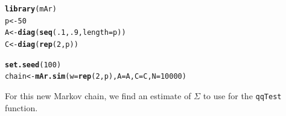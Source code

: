 \documentclass[11pt]{article}\usepackage[]{graphicx}\usepackage[]{color}
\makeatletter
\newcommand{\hlnum}[1]{\textcolor[rgb]{0.686,0.059,0.569}{#1}}%
\newcommand{\hlstd}[1]{\textcolor[rgb]{0.345,0.345,0.345}{#1}}%
\newcommand{\hlkwb}[1]{\textcolor[rgb]{0.69,0.353,0.396}{#1}}%
\newcommand{\hlkwc}[1]{\textcolor[rgb]{0.333,0.667,0.333}{#1}}%
\newcommand{\hlkwd}[1]{\textcolor[rgb]{0.737,0.353,0.396}{\textbf{#1}}}%
\newenvironment{kframe}{%
 \def\at@end@of@kframe{}%
 \ifinner\ifhmode%
  \def\at@end@of@kframe{\end{minipage}}%
  \begin{minipage}{\columnwidth}%
 \fi\fi%
 \def\FrameCommand##1{\hskip\@totalleftmargin \hskip-\fboxsep
 \colorbox{shadecolor}{##1}\hskip-\fboxsep
     \hskip-\linewidth \hskip-\@totalleftmargin \hskip\columnwidth}%
 \MakeFramed {\advance\hsize-\width
   \@totalleftmargin\z@ \linewidth\hsize
   \@setminipage}}%
 {\par\unskip\endMakeFramed%
 \at@end@of@kframe}
\newenvironment{knitrout}{}{} %
\makeatother
\begin{document}
\begin{knitrout}
\color{fgcolor}\begin{kframe}
\begin{alltt}
\hlkwd{library}\hlstd{(mAr)}
\hlstd{p} \hlkwb{<-} \hlnum{50}
\hlstd{A} \hlkwb{<-} \hlkwd{diag}\hlstd{(}\hlkwd{seq}\hlstd{(}\hlnum{.1}\hlstd{,} \hlnum{.9}\hlstd{,} \hlkwc{length} \hlstd{= p))}
\hlstd{C} \hlkwb{<-} \hlkwd{diag}\hlstd{(}\hlkwd{rep}\hlstd{(}\hlnum{2}\hlstd{, p))}

\hlkwd{set.seed}\hlstd{(}\hlnum{100}\hlstd{)}
\hlstd{chain} \hlkwb{<-} \hlkwd{mAr.sim}\hlstd{(}\hlkwc{w} \hlstd{=} \hlkwd{rep}\hlstd{(}\hlnum{2}\hlstd{,p),} \hlkwc{A} \hlstd{= A,} \hlkwc{C} \hlstd{= C,} \hlkwc{N} \hlstd{=} \hlnum{10000}\hlstd{)}
\end{alltt}
\end{kframe}
\end{knitrout}

For this new Markov chain, we find an estimate of $\Sigma$ to use for the \texttt{qqTest} function.
\end{document}
